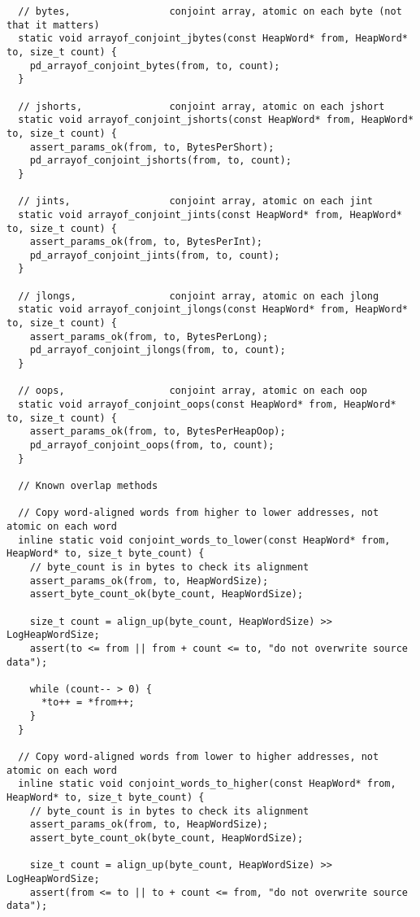 \begin{itemize}
\begin{verbatim}
  // bytes,                 conjoint array, atomic on each byte (not that it matters)
  static void arrayof_conjoint_jbytes(const HeapWord* from, HeapWord* to, size_t count) {
    pd_arrayof_conjoint_bytes(from, to, count);
  }

  // jshorts,               conjoint array, atomic on each jshort
  static void arrayof_conjoint_jshorts(const HeapWord* from, HeapWord* to, size_t count) {
    assert_params_ok(from, to, BytesPerShort);
    pd_arrayof_conjoint_jshorts(from, to, count);
  }

  // jints,                 conjoint array, atomic on each jint
  static void arrayof_conjoint_jints(const HeapWord* from, HeapWord* to, size_t count) {
    assert_params_ok(from, to, BytesPerInt);
    pd_arrayof_conjoint_jints(from, to, count);
  }

  // jlongs,                conjoint array, atomic on each jlong
  static void arrayof_conjoint_jlongs(const HeapWord* from, HeapWord* to, size_t count) {
    assert_params_ok(from, to, BytesPerLong);
    pd_arrayof_conjoint_jlongs(from, to, count);
  }

  // oops,                  conjoint array, atomic on each oop
  static void arrayof_conjoint_oops(const HeapWord* from, HeapWord* to, size_t count) {
    assert_params_ok(from, to, BytesPerHeapOop);
    pd_arrayof_conjoint_oops(from, to, count);
  }

  // Known overlap methods

  // Copy word-aligned words from higher to lower addresses, not atomic on each word
  inline static void conjoint_words_to_lower(const HeapWord* from, HeapWord* to, size_t byte_count) {
    // byte_count is in bytes to check its alignment
    assert_params_ok(from, to, HeapWordSize);
    assert_byte_count_ok(byte_count, HeapWordSize);

    size_t count = align_up(byte_count, HeapWordSize) >> LogHeapWordSize;
    assert(to <= from || from + count <= to, "do not overwrite source data");

    while (count-- > 0) {
      *to++ = *from++;
    }
  }

  // Copy word-aligned words from lower to higher addresses, not atomic on each word
  inline static void conjoint_words_to_higher(const HeapWord* from, HeapWord* to, size_t byte_count) {
    // byte_count is in bytes to check its alignment
    assert_params_ok(from, to, HeapWordSize);
    assert_byte_count_ok(byte_count, HeapWordSize);

    size_t count = align_up(byte_count, HeapWordSize) >> LogHeapWordSize;
    assert(from <= to || to + count <= from, "do not overwrite source data");


\end{verbatim}
\end{itemize}
